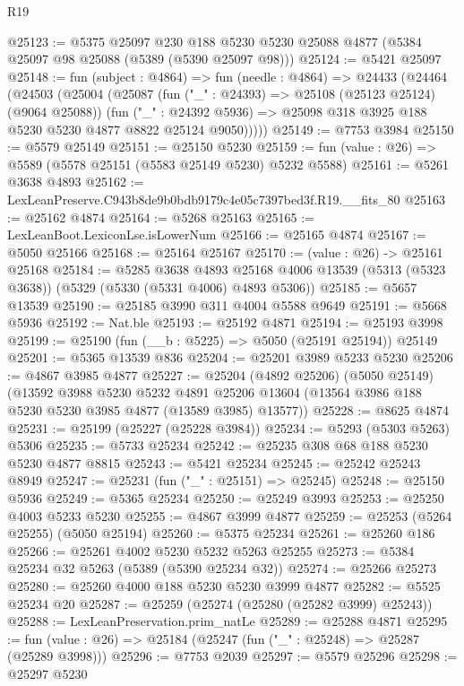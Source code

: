 \begin{lexlean}{R19}
\begin{coremodule}
@25123 := @5375
    @25097
    @230
    @188
    @5230
    @5230
    @25088
    @4877
    (@5384 @25097 @98 @25088 (@5389 (@5390 @25097 @98)))
@25124 := @5421 @25097
@25148 := fun (subject : @4864) =>
  fun (needle : @4864) =>
  @24433
    (@24464
      (@24503
        (@25004
          (@25087
            (fun ("_" : @24393) => @25108 (@25123 @25124) (@9064 @25088))
            (fun ("_" : @24392 @5936) =>
            @25098 @318 @3925 @188 @5230 @5230 @4877 @8822 @25124 @9050)))))
@25149 := @7753 @3984
@25150 := @5579 @25149
@25151 := @25150 @5230
@25159 := fun (value : @26) => @5589 (@5578 @25151 (@5583 @25149 @5230) @5232 @5588)
@25161 := @5261 @3638 @4893
@25162 := LexLeanPreserve.C943b8de9b0bdb9179c4e05c7397bed3f.R19.__fits_80
@25163 := @25162 @4874
@25164 := @5268 @25163
@25165 := LexLeanBoot.LexiconLse.isLowerNum
@25166 := @25165 @4874
@25167 := @5050 @25166
@25168 := @25164 @25167
@25170 := (value : @26) -> @25161 @25168
@25184 := @5285
    @3638
    @4893
    @25168
    @4006
    @13539
    (@5313 (@5323 @3638))
    (@5329 (@5330 (@5331 @4006) @4893 @5306))
@25185 := @5657 @13539
@25190 := @25185 @3990 @311 @4004 @5588 @9649
@25191 := @5668 @5936
@25192 := Nat.ble
@25193 := @25192 @4871
@25194 := @25193 @3998
@25199 := @25190 (fun (__b : @5225) => @5050 (@25191 @25194)) @25149
@25201 := @5365 @13539 @836
@25204 := @25201 @3989 @5233 @5230
@25206 := @4867 @3985 @4877
@25227 := @25204
    (@4892 @25206)
    (@5050 @25149)
    (@13592
      @3988
      @5230
      @5232
      @4891
      @25206
      @13604
      (@13564 @3986 @188 @5230 @5230 @3985 @4877 (@13589 @3985) @13577))
@25228 := @8625 @4874
@25231 := @25199 (@25227 (@25228 @3984))
@25234 := @5293 (@5303 @5263) @5306
@25235 := @5733 @25234
@25242 := @25235 @308 @68 @188 @5230 @5230 @4877 @8815
@25243 := @5421 @25234
@25245 := @25242 @25243 @8949
@25247 := @25231 (fun ("_" : @25151) => @25245)
@25248 := @25150 @5936
@25249 := @5365 @25234
@25250 := @25249 @3993
@25253 := @25250 @4003 @5233 @5230
@25255 := @4867 @3999 @4877
@25259 := @25253 (@5264 @25255) (@5050 @25194)
@25260 := @5375 @25234
@25261 := @25260 @186
@25266 := @25261 @4002 @5230 @5232 @5263 @25255
@25273 := @5384 @25234 @32 @5263 (@5389 (@5390 @25234 @32))
@25274 := @25266 @25273
@25280 := @25260 @4000 @188 @5230 @5230 @3999 @4877
@25282 := @5525 @25234 @20
@25287 := @25259 (@25274 (@25280 (@25282 @3999) @25243))
@25288 := LexLeanPreservation.prim_natLe
@25289 := @25288 @4871
@25295 := fun (value : @26) => @25184 (@25247 (fun ("_" : @25248) => @25287 (@25289 @3998)))
@25296 := @7753 @2039
@25297 := @5579 @25296
@25298 := @25297 @5230

\end{coremodule}
\end{lexlean}

